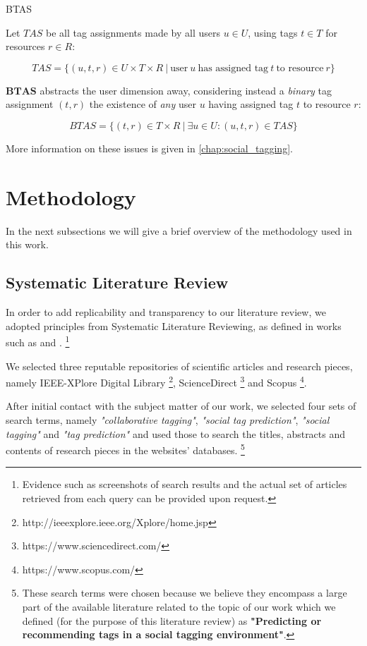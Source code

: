 \begin{definition}{BTAS}

Let $TAS$ be all tag assignments made by all users $u \in U$, using tags $t \in T$ for resources $r \in R$:

\[ TAS = \{ (u,t,r) \in  U \times T \times R \ | \ \text{user} \ u \ \text{has assigned tag} \ t \ \text{to resource} \ r \} \]  

$\mathbf{BTAS}$ abstracts the user dimension away, considering instead a \textit{binary} tag assignment $(t,r)$ the existence of \textit{any} user $u$ having assigned tag $t$ to resource $r$:

\[ BTAS = \{(t,r) \in T \times R \ | \ \exists u \in U : (u,t,r) \in TAS \}  \]

\end{definition}

More information on these issues is given in \autoref{chap:social_tagging}.

\section{Methodology}\label{section:intro_methodology}

In the next subsections we will give a brief overview of the methodology used in this work.

\subsection{Systematic Literature Review}\label{section:literature_review}

In order to add replicability and transparency to our literature review, we adopted principles from Systematic Literature Reviewing, as defined in works such as \cite{baumeister_leary_1997} and \cite{bem_1995}. \footnote{Evidence such as screenshots of search results and the actual set of articles retrieved from each query can be provided upon request.}

We selected three reputable repositories of scientific articles and research pieces, namely IEEE-XPlore Digital Library \footnote{http://ieeexplore.ieee.org/Xplore/home.jsp}, ScienceDirect \footnote{https://www.sciencedirect.com/} and Scopus \footnote{https://www.scopus.com/}.

After initial contact with the subject matter of our work, we selected four sets of search terms, namely \textit{"collaborative tagging"}, \textit{"social tag prediction"}, \textit{"social tagging"} and \textit{"tag prediction"} and used those to search the titles, abstracts and contents of research pieces in the websites' databases. \footnote{These search terms were chosen because we believe they encompass a large part  of the available literature related to the topic of our work which we defined (for the purpose of this literature review) as \textbf{"Predicting or recommending tags in a social tagging environment"}.} 

